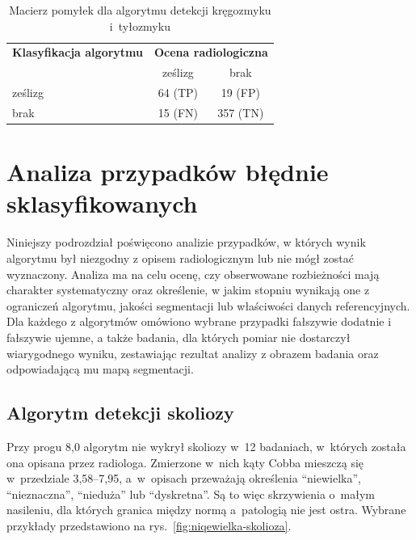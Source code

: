 \begin{table}[H]
    \centering
    \captionsetup{justification=centering, font=small}
    \caption{Macierz pomyłek dla algorytmu detekcji kręgozmyku i~tyłozmyku}
    \label{tab:macierz-kregozmyk}
    \begin{tabular}{lcc}
        \hline
        \textbf{Klasyfikacja algorytmu} & \multicolumn{2}{c}{\textbf{Ocena radiologiczna}} \\
        & ześlizg & brak    \\
        \hline
        ześlizg & 64 (TP)  & 19 (FP)  \\
        brak    & 15 (FN)  & 357 (TN) \\
        \hline
    \end{tabular}
\end{table}


\section{Analiza przypadków błędnie sklasyfikowanych}
\label{sec:bledy}

Niniejszy podrozdział poświęcono analizie przypadków, w których wynik algorytmu był niezgodny z opisem radiologicznym lub nie mógł zostać wyznaczony. Analiza ma na celu ocenę, czy obserwowane rozbieżności mają charakter systematyczny oraz określenie, w jakim stopniu wynikają one z ograniczeń algorytmu, jakości segmentacji lub właściwości danych referencyjnych. Dla każdego z algorytmów omówiono wybrane przypadki fałszywie dodatnie i fałszywie ujemne, a także badania, dla których pomiar nie dostarczył wiarygodnego wyniku, zestawiając rezultat analizy z obrazem badania oraz odpowiadającą mu mapą segmentacji.

\subsection{Algorytm detekcji skoliozy}
\label{subsec:bledy-skolioza}

Przy progu 8,0\degree{} algorytm nie wykrył skoliozy w~12 badaniach, w~których została ona opisana przez radiologa.
Zmierzone w~nich kąty Cobba mieszczą się w~przedziale 3,58--7,95\degree{}, a~w~opisach przeważają określenia \enquote{niewielka}, \enquote{nieznaczna}, \enquote{nieduża} lub \enquote{dyskretna}.
Są to więc skrzywienia o~małym nasileniu, dla których granica między normą a~patologią nie jest ostra.
Wybrane przykłady przedstawiono na rys.~\ref{fig:niqewielka-skolioza}.

